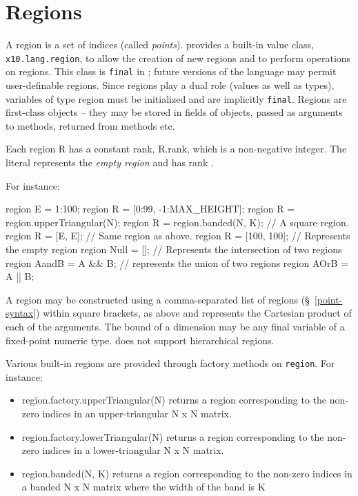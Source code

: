 \section{Regions}\label{XtenRegions}

A region is a set of indices (called {\em points}).  {}\Xten{}
provides a built-in value class, {\tt x10.lang.region}, to allow the
creation of new regions and to perform operations on regions. This
class is {\tt final} in {}\XtenCurrVer; future versions of the
language may permit user-definable regions. Since regions play a dual
role (values as well as types), variables of type {\cf region} must be
initialized and are implicitly {\tt final}. Regions are first-class
objects -- they may be stored in fields of objects, passed as
arguments to methods, returned from methods etc.

Each region {\cf R} has a constant rank, {\cf R.rank}, which is a
non-negative integer. The literal {\cf []} represents the {\em empty
region} and has rank {}.

For instance:
\begin{x10}
   region E = 1:100;
   region R = [0:99, -1:MAX\_HEIGHT];   
   region R = region.upperTriangular(N);
   region R = region.banded(N, K);
     // A square region.
   region R = [E, E];           
     // Same region as above.
   region R = [100, 100];       
     // Represents  the empty region
   region Null = [];            
     // Represents the intersection of two regions
   region AandB = A \&\& B;       
     // represents the union of two regions
   region AOrB = A || B;        
\end{x10}

A region may be constructed using a comma-separated list of regions
(\S~\ref{point-syntax}) within square brackets, as above and represents
the Cartesian product of each of the arguments.  The bound of a
dimension may be any final variable of a fixed-point numeric
type. \XtenCurrVer{} does not support hierarchical regions.

Various built-in regions are provided through  factory
methods on {\tt region}.  For instance:
\begin{itemize}
{}\item {\cf region.factory.upperTriangular(N)} returns a region corresponding
to the non-zero indices in an upper-triangular {\cf N x N} matrix.
{}\item {\cf region.factory.lowerTriangular(N)} returns a region corresponding
to the non-zero indices in a lower-triangular {\cf N x N} matrix.
{}\item {\cf region.banded(N, K)} returns a region corresponding to
the non-zero indices in a banded {\cf N x N} matrix where the width of
the band is {\cf K}
\end{itemize}

